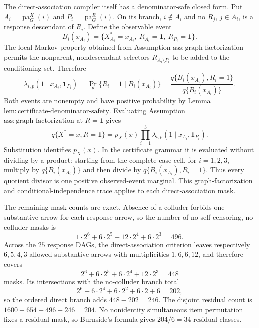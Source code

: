 The direct-association compiler itself has a denominator-safe closed form. Put \(A_i=\operatorname{pa}^X_G(i)\) and \(P_i=\operatorname{pa}^R_G(i)\). On its branch, \(i\notin A_i\) and no \(R_j\), \(j\in A_i\), is a response descendant of \(R_i\). Define the observable event
\[
B_i(x_{A_i})=\{X_{A_i}^*=x_{A_i},\ R_{A_i}=\mathbf1,\ R_{P_i}=\mathbf1\}.
\]
The local Markov property obtained from Assumption \(\mathrm{ass{:}graph\text{-}factorization}\) permits the nonparent, nondescendant selectors \(R_{A_i\setminus P_i}\) to be added to the conditioning set. Therefore
\[
\lambda_{i,p}(1\mid x_{A_i},\mathbf1_{P_i})
=\Pr_p\{R_i=1\mid B_i(x_{A_i})\}
=\frac{q\{B_i(x_{A_i}),R_i=1\}}{q\{B_i(x_{A_i})\}}.
\]
Both events are nonempty and have positive probability by Lemma \(\mathrm{lem{:}certificate\text{-}denominator\text{-}safety}\). Evaluating Assumption \(\mathrm{ass{:}graph\text{-}factorization}\) at \(R=\mathbf1\) gives
\[
q\{X^*=x,R=\mathbf1\}
=p_X(x)\prod_{i=1}^3\lambda_{i,p}(1\mid x_{A_i},\mathbf1_{P_i}).
\]
Substitution identifies \(p_X(x)\). In the certificate grammar it is evaluated without dividing by a product: starting from the complete-case cell, for \(i=1,2,3\), multiply by \(q\{B_i(x_{A_i})\}\) and then divide by \(q\{B_i(x_{A_i}),R_i=1\}\). Thus every quotient divisor is one positive observed-event marginal. This graph-factorization and conditional-independence trace applies to each direct-association mask.

The remaining mask counts are exact. Absence of a colluder forbids one substantive arrow for each response arrow, so the number of no-self-censoring, no-colluder masks is
\[
1\cdot2^6+6\cdot2^5+12\cdot2^4+6\cdot2^3=496.
\]
Across the \(25\) response DAGs, the direct-association criterion leaves respectively \(6,5,4,3\) allowed substantive arrows with multiplicities \(1,6,6,12\), and therefore covers
\[
2^6+6\cdot2^5+6\cdot2^4+12\cdot2^3=448
\]
masks. Its intersections with the no-colluder branch total
\[
2^6+6\cdot2^4+6\cdot2^2+6\cdot2+6=202,
\]
so the ordered direct branch adds \(448-202=246\). The disjoint residual count is \(1600-654-496-246=204\). No nonidentity simultaneous item permutation fixes a residual mask, so Burnside's formula gives \(204/6=34\) residual classes.

